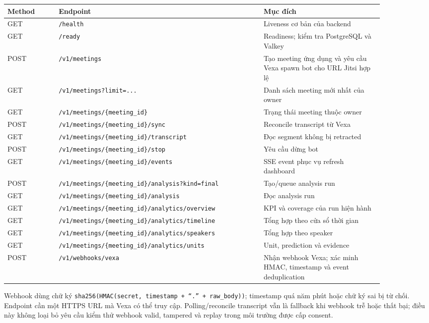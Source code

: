 \begin{longtable}{p{0.12\linewidth}p{0.48\linewidth}p{0.28\linewidth}}
\toprule
\textbf{Method} & \textbf{Endpoint} & \textbf{Mục đích} \\
\midrule
\endhead
\bottomrule
\endfoot
GET & \texttt{/health} & Liveness cơ bản của backend \\
GET & \texttt{/ready} & Readiness; kiểm tra PostgreSQL và Valkey \\
POST & \texttt{/v1/meetings} & Tạo meeting ứng dụng và yêu cầu Vexa spawn bot cho URL Jitsi hợp lệ \\
GET & \texttt{/v1/meetings?limit=...} & Danh sách meeting mới nhất của owner \\
GET & \texttt{/v1/meetings/\{meeting\_id\}} & Trạng thái meeting thuộc owner \\
POST & \texttt{/v1/meetings/\{meeting\_id\}/sync} & Reconcile transcript từ Vexa \\
GET & \texttt{/v1/meetings/\{meeting\_id\}/transcript} & Đọc segment không bị retracted \\
POST & \texttt{/v1/meetings/\{meeting\_id\}/stop} & Yêu cầu dừng bot \\
GET & \texttt{/v1/meetings/\{meeting\_id\}/events} & SSE event phục vụ refresh dashboard \\
POST & \texttt{/v1/meetings/\{meeting\_id\}/analysis?kind=final} & Tạo/queue analysis run \\
GET & \texttt{/v1/meetings/\{meeting\_id\}/analysis} & Đọc analysis run \\
GET & \texttt{/v1/meetings/\{meeting\_id\}/analytics/overview} & KPI và coverage của run hiện hành \\
GET & \texttt{/v1/meetings/\{meeting\_id\}/analytics/timeline} & Tổng hợp theo cửa sổ thời gian \\
GET & \texttt{/v1/meetings/\{meeting\_id\}/analytics/speakers} & Tổng hợp theo speaker \\
GET & \texttt{/v1/meetings/\{meeting\_id\}/analytics/units} & Unit, prediction và evidence \\
POST & \texttt{/v1/webhooks/vexa} & Nhận webhook Vexa; xác minh HMAC, timestamp và event deduplication \\
\end{longtable}

Webhook dùng chữ ký \texttt{sha256(HMAC(secret, timestamp + ``.'' + raw\_body))}; timestamp quá năm phút hoặc chữ ký sai bị từ chối. Endpoint cần một HTTPS URL mà Vexa có thể truy cập. Polling/reconcile transcript vẫn là fallback khi webhook trễ hoặc thất bại; điều này không loại bỏ yêu cầu kiểm thử webhook valid, tampered và replay trong môi trường được cấp consent.

